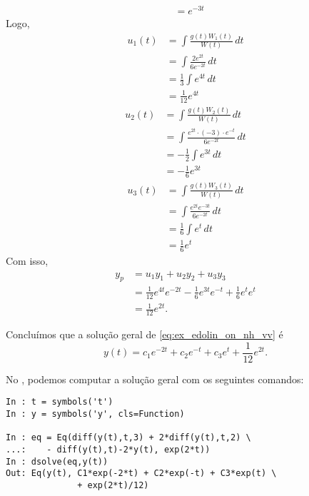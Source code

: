 \begin{ex}
\begin{align}
           &= e^{-3t}
  \end{align}
  Logo,
  \begin{align}
    u_1(t) &= \int \frac{g(t)W_1(t)}{W(t)}\,dt \\
           &= \int \frac{2e^{2t}}{6e^{-2t}}\,dt \\
           &= \frac{1}{3}\int e^{4t}\,dt \\
           &= \frac{1}{12}e^{4t}
  \end{align}
  \begin{align}
    u_2(t) &= \int \frac{g(t)W_2(t)}{W(t)}\,dt \\
           &= \int \frac{e^{2t}\cdot (-3)\cdot e^{-t}}{6e^{-2t}}\,dt \\
           &= -\frac{1}{2}\int e^{3t}\,dt \\
           &= -\frac{1}{6}e^{3t}
  \end{align}
  \begin{align}
    u_3(t) &= \int \frac{g(t)W_3(t)}{W(t)}\,dt \\
           &= \int \frac{e^{2t}e^{-3t}}{6e^{-2t}}\,dt \\
           &= \frac{1}{6}\int e^{t}\,dt \\
           &= \frac{1}{6}e^{t}
  \end{align}
  Com isso,
  \begin{align}
    y_p &= u_1y_1 + u_2y_2 + u_3y_3 \\
        &= \frac{1}{12}e^{4t}e^{-2t} - \frac{1}{6}e^{3t}e^{-t}+\frac{1}{6}e^te^t \\
        &= \frac{1}{12}e^{2t}.
  \end{align}

  Concluímos que a solução geral de \eqref{eq:ex_edolin_on_nh_vv} é
  \begin{equation}
    y(t) = c_1e^{-2t}+c_2e^{-t}+c_3e^t+\frac{1}{12}e^{2t}.
  \end{equation}

  \ifispython
  No \python, podemos computar a solução geral com os seguintes comandos:
\begin{verbatim}
In : t = symbols('t')
In : y = symbols('y', cls=Function)

In : eq = Eq(diff(y(t),t,3) + 2*diff(y(t),t,2) \
...:    - diff(y(t),t)-2*y(t), exp(2*t))
In : dsolve(eq,y(t))
Out: Eq(y(t), C1*exp(-2*t) + C2*exp(-t) + C3*exp(t) \
              + exp(2*t)/12)
\end{verbatim}
  \fi
\end{ex}


